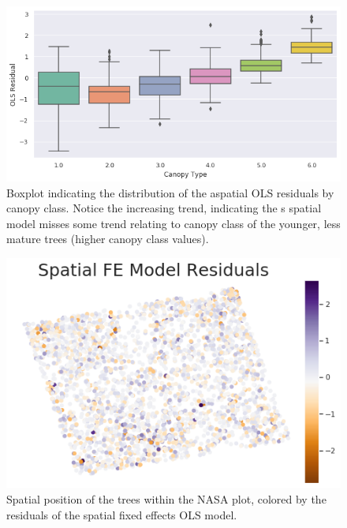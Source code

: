 \documentclass[12pt,a4paper]{article}
\begin{document}
\begin{figure}[H]
\centering
\includegraphics[scale=.7]{../figures/OLS_mod_residuals_by_Canopy.png}
\caption{Boxplot indicating the distribution of the aspatial OLS residuals by canopy class.  Notice the increasing trend, indicating the s spatial model misses some trend relating to canopy class of the younger, less mature trees (higher canopy class values).}
\label{OLS_mod_residuals_by_Canopy} 
\end{figure}


\begin{figure}[H]
\centering
\includegraphics[scale=.8]{../figures/SFE_mod_residuals_map.png}
\caption{Spatial position of the trees within the NASA plot, colored by the residuals of the spatial fixed effects OLS model.}
\label{SFE_mod_residuals_map} 
\end{figure}
\end{document}
